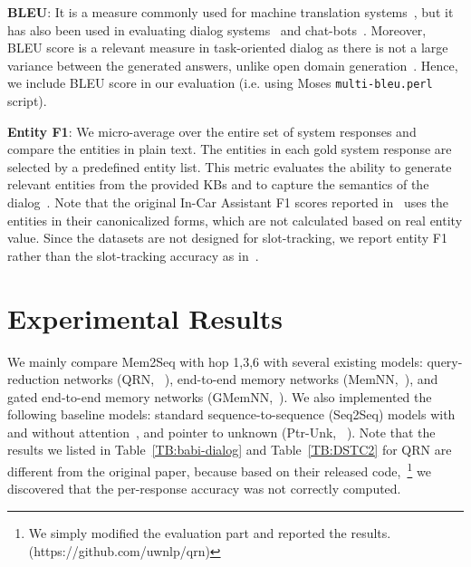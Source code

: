 \documentclass[11pt,a4paper]{article}
\begin{document}
\noindent\textbf{BLEU}: It is a measure commonly used for machine translation systems~\cite{papineniBLEU2002}, but it has also been used in evaluating dialog systems~\cite{eric-manning:2017:EACLshort,zhao2017generative} and chat-bots~\cite{ritter2011data,li-EtAl:2016:N16-11}. Moreover, BLEU score is a relevant measure in task-oriented dialog as there is not a large variance between the generated answers, unlike open domain generation~\cite{liu-EtAl:2016:EMNLP20163}. Hence, we include BLEU score in our evaluation (i.e. using Moses \texttt{multi-bleu.perl} script).

\noindent\textbf{Entity F1}:
We micro-average over the entire set of system responses and compare the entities in plain text. The entities in each gold system response are selected by a predefined entity list. This metric evaluates the ability to generate relevant entities from the provided KBs and to capture the semantics of the dialog~\cite{eric-manning:2017:EACLshort,ericKVR2017}. Note that the original In-Car Assistant F1 scores reported in~\citet{ericKVR2017} uses the entities in their canonicalized forms, which are not calculated based on real entity value. Since the datasets are not designed for slot-tracking, we report entity F1 rather than the slot-tracking accuracy as in~\cite{wen2016network,zhao2017generative}. 

\section{Experimental Results}
We mainly compare Mem2Seq with hop 1,3,6 with several existing models: query-reduction networks (QRN, ~\citet{seo2016query}), end-to-end memory networks (MemNN,~\citet{sukhbaatar2015end}), and gated end-to-end memory networks (GMemNN,~\citet{perez2016gated}). We also implemented the following baseline models: standard sequence-to-sequence (Seq2Seq) models with and without attention~\cite{luong-pham-manning:2015:EMNLP}, and pointer to unknown (Ptr-Unk, ~\citet{gulcehre-EtAl:2016:P16-1}). Note that the results we listed in Table~\ref{TB:babi-dialog} and Table~\ref{TB:DSTC2} for QRN are different from the original paper, because based on their released code,~\footnote{We simply modified the evaluation part and reported the results. (https://github.com/uwnlp/qrn)} 
we discovered that the per-response accuracy was not correctly computed. 
\end{document}
